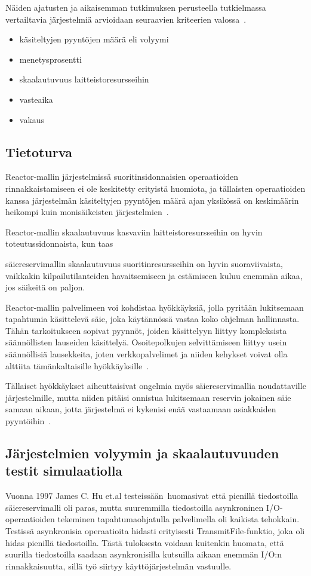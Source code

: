 \documentclass[12pt]{article}
\begin{document}
Näiden ajatusten ja aikaisemman tutkimuksen perusteella
tutkielmassa vertailtavia järjestelmiä arvioidaan seuraavien
kriteerien valossa~\cite{gokhale_performance_2006}.
\begin{itemize}
    \item käsiteltyjen pyyntöjen määrä eli volyymi
    \item menetysprosentti
    \item skaalautuvuus laitteistoresursseihin
    \item vasteaika
    \item vakaus
\end{itemize}
\subsection{Tietoturva}

Reactor-mallin järjestelmissä suoritinsidonnaisien
operaatioiden rinnakkaistamiseen ei ole keskitetty erityistä huomiota, ja tällaisten operaatioiden
kanssa järjestelmän käsiteltyjen pyyntöjen määrä ajan yksikössä on keskimäärin heikompi
kuin monisäikeisten järjestelmien~\cite{davis_case_2017}.

Reactor-mallin skaalautuvuus kasvaviin laitteistoresursseihin on hyvin
toteutussidonnaista, kun taas

säiereservimallin skaalautuvuus suoritinresursseihin on hyvin suoraviivaista,
vaikkakin kilpailutilanteiden havaitsemiseen ja estämiseen kuluu enemmän aikaa,
jos säikeitä on paljon.

Reactor-mallin palvelimeen voi kohdistaa hyökkäyksiä, jolla pyritään
lukitsemaan tapahtumia käsittelevä säie, joka käytännössä vastaa koko ohjelman hallinnasta.
Tähän tarkoitukseen sopivat pyynnöt,
joiden käsittelyyn liittyy kompleksista säännöllisten lauseiden käsittelyä.
Osoitepolkujen selvittämiseen liittyy usein säännöllisiä lausekkeita,
joten verkkopalvelimet ja niiden
kehykset voivat olla alttiita tämänkaltaisille hyökkäyksille~\cite{davis_case_2017}.

Tällaiset hyökkäykset aiheuttaisivat ongelmia myös säiereservimallia
noudattaville järjestelmille, mutta niiden pitäisi onnistua
lukitsemaan reservin jokainen säie samaan aikaan, jotta
järjestelmä ei kykenisi enää vastaamaan asiakkaiden pyyntöihin~\cite{davis_case_2017}.

\subsection{Järjestelmien volyymin ja skaalautuvuuden testit simulaatiolla}
Vuonna 1997 James C. Hu et.al testeissään~\cite{hu_measuring_1997}huomasivat
että pienillä tiedostoilla säiereservimalli oli paras,
mutta suuremmilla tiedostoilla asynkroninen I/O-operaatioiden
tekeminen tapahtumaohjatulla palvelimella oli kaikista tehokkain.
Testissä asynkronisia operaatioita hidasti
erityisesti TransmitFile-funktio, joka oli 
hidas pienillä tiedostoilla.
Tästä tuloksesta voidaan kuitenkin huomata,
että suurilla tiedostoilla saadaan asynkronisilla
kutsuilla aikaan enemmän I/O:n rinnakkaisuutta, sillä
työ siirtyy käyttöjärjestelmän vastuulle.
\end{document}
